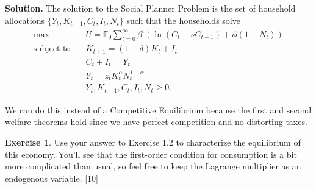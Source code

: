 \documentclass[11pt]{article}
\numberwithin{equation}{section} %
\numberwithin{figure}{section} %
\numberwithin{table}{section} %
\theoremstyle{definition}
\newtheorem{exercise}[theorem]{Exercise}
\newenvironment{solution}{\begin{addmargin}[2em]{0em} {\bf Solution. }}{\end{addmargin}}
\newcommand{\E}{\mathbb{E}}
\begin{document}
\begin{solution}
    The solution to the Social Planner Problem is the set of household allocations $\{Y_t, K_{t+1}, C_t, I_t, N_t\}$ such that the households solve
    \begin{alignat*}{4}
        \text{max} \quad & U = \E_0 \sum_{t=0}^\infty \beta^t \left( \ln \left(C_t - \nu C_{t-1}\right) + \phi \left(1 - N_t\right) \right) \\
        \text{subject to} \quad & K_{t + 1} = (1 - \delta)K_t + I_t \\
        & C_t + I_t = Y_t \\
        & Y_t = z_t K_t^\alpha N_t^{1 - \alpha} \\
        & Y_t, K_{t+1}, C_t, I_t, N_t \geq 0.
    \end{alignat*}

    We can do this instead of a Competitive Equilibrium because the first and second welfare theorems hold since we have perfect competition and no distorting taxes.
\end{solution}


\begin{exercise}
    Use your answer to Exercise 1.2 to characterize the equilibrium of this economy. You'll see that the first-order condition for consumption is a bit more complicated than usual, so feel free to keep the Lagrange multiplier as an endogenous variable. [10]
\end{exercise}
\end{document}
